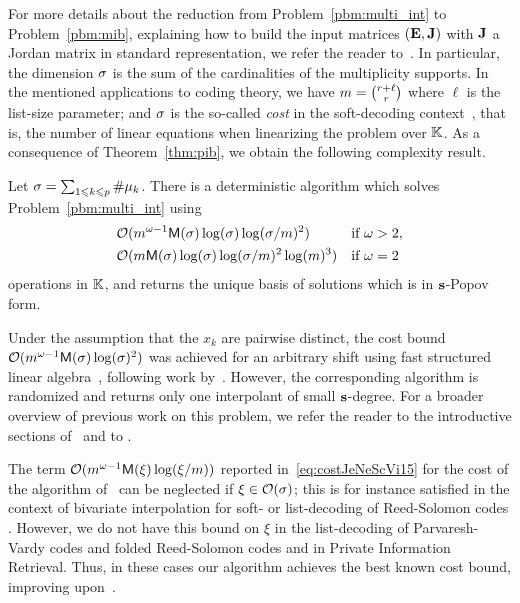 \documentclass[preprint]{sig-alternate-05-2015}
\begin{document}
For more details about the reduction from Problem~\ref{pbm:multi_int} to
Problem~\ref{pbm:mib}, explaining how to build the input matrices
$(\evMat,\mulmat)$ with $\mulmat$ a Jordan matrix in standard representation,
we refer the reader to~\cite[Subsection~2.4]{JeNeScVi15}. In particular, the
dimension $\sigma$ is the sum of the cardinalities of the multiplicity
supports. In the mentioned applications to coding theory, we have $m =
\binom{r+\ell}{r}$ where $\ell$ is the list-size parameter; and
$\sigma$ is the so-called \emph{cost} in the soft-decoding
context~\cite[Section~III]{KoeVar03a}, that is, the number of linear equations
when linearizing the problem over $\mathbb{K}$. As a consequence of
Theorem~\ref{thm:pib}, we obtain the following complexity result.

\begin{thm}
  \label{thm:multi_int} 
  Let $\sigma = \sum_{1\leqslant k\leqslant p} \#\mu_k$. There is a deterministic
  algorithm which solves Problem~\ref{pbm:multi_int} using
  \begin{align*}
  \mathcal{O}( & m^{\omega-1} \mathsf{M}(\sigma)
  \log(\sigma) \log(\sigma/m)^2 ) & \text{if }
  \omega>2, \\
  \mathcal{O}( & m \mathsf{M}(\sigma) \log(\sigma)
  \log(\sigma/m)^2 \log(m)^3 
  ) & \text{if } \omega=2\;
  \end{align*}
  operations in $\mathbb{K}$, and returns the unique basis of solutions which is in
  $\mathbf{s}$-Popov form.
\end{thm}

Under the assumption that the $x_k$ are pairwise distinct, the cost bound
$\mathcal{O}( m^{\omega-1} \mathsf{M}(\sigma) \log(\sigma)^2 )$ was achieved
for an arbitrary shift using fast structured linear
algebra~\cite[Theorems~1~and~2]{CJNSV15}, following work
by~\cite{OlsSho99,RotRuc00,ZeGeAu11}. However, the corresponding algorithm is
randomized and returns only one interpolant of small $\mathbf{s}$-degree. For a
broader overview of previous work on this problem, we refer the reader to the
introductive sections of~\cite{BeeBra10,CJNSV15} and to
\cite[Section~2]{JeNeScVi15}.

The term $\mathcal{O}(m^{\omega-1} \mathsf{M}(\xi) \log(\xi/m))$
reported in~\eqref{eq:costJeNeScVi15} for the cost of the algorithm
of~\cite{JeNeScVi15} can be neglected if $\xi \in \mathcal{O}(\sigma)$; this is for
instance satisfied in the context of bivariate interpolation for soft- or
list-decoding of Reed-Solomon codes \cite[Sections~2.5 and~2.6]{JeNeScVi15}.
However, we do not have this bound on $\xi$ in the list-decoding of
Parvaresh-Vardy codes and folded Reed-Solomon codes and in Private Information
Retrieval. Thus, in these cases our algorithm achieves the best known cost
bound, improving upon~\cite{PB08,KB10,CohHen12,DeGoHe12a,JeNeScVi15}.
\end{document}
